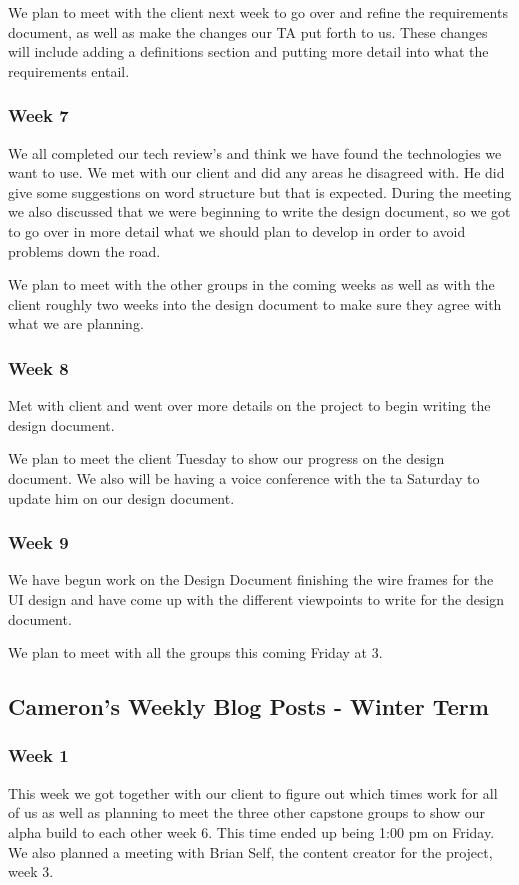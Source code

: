 We plan to meet with the client next week to go over and refine the requirements document, as well as make the changes our TA put forth to us. These changes will include adding a definitions section and putting more detail into what the requirements entail.

\subsubsection{Week 7}
We all completed our tech review's and think we have found the technologies we want to use. We met with our client and did any areas he disagreed with. He did give some suggestions on word structure but that is expected. During the meeting we also discussed that we were beginning to write the design document, so we got to go over in more detail what we should plan to develop in order to avoid problems down the road.

We plan to meet with the other groups in the coming weeks as well as with the client roughly two weeks into the design document to make sure they agree with what we are planning. 

\subsubsection{Week 8}
Met with client and went over more details on the project to begin writing the design document. 

We plan to meet the client Tuesday to show our progress on the design document. We also will be having a voice conference with the ta Saturday to update him on our design document. 

\subsubsection{Week 9}
We have begun work on the Design Document finishing the wire frames for the UI design and have come up with the different viewpoints to write for the design document.

We plan to meet with all the groups this coming Friday at 3.

\subsection{Cameron's Weekly Blog Posts - Winter Term}

\subsubsection{Week 1}
This week we got together with our client to figure out which times work for all of us as well as planning to meet the three other capstone groups to show our alpha build to each other week 6. This time ended up being 1:00 pm on Friday. We also planned a meeting with Brian Self, the content creator for the project, week 3. 

